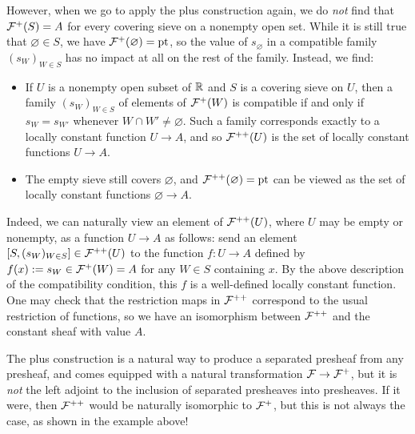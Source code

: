 \begin{example}
    However, when we go to apply the plus construction again, we do \emph{not} find that $\cal{F}^+(S) = A$ for every covering sieve on a nonempty open set. While it is still true that $\varnothing \in S$, we have $\cal{F}^+(\varnothing) = \pt$, so the value of $s_\varnothing$ in a compatible family $(s_W)_{W \in S}$ has no impact at all on the rest of the family. Instead, we find:
    \begin{itemize}
        \item If $U$ is a nonempty open subset of $\RR$ and $S$ is a covering sieve on $U$, then a family $(s_W)_{W \in S}$ of elements of $\cal{F}^+(W)$ is compatible if and only if $s_W = s_{W'}$ whenever $W \cap W' \neq \varnothing$. Such a family corresponds exactly to a locally constant function $U \to A$, and so $\cal{F}^{++}(U)$ is the set of locally constant functions $U \to A$.
        \item The empty sieve still covers $\varnothing$, and $\cal{F}^{++}(\varnothing) = \pt$ can be viewed as the set of locally constant functions $\varnothing \to A$.
    \end{itemize}
    Indeed, we can naturally view an element of $\cal{F}^{++}(U)$, where $U$ may be empty or nonempty, as a function $U \to A$ as follows: send an element $[S,(s_W)_{W \in S}] \in \cal{F}^{++}(U)$ to the function $f : U \to A$ defined by $f(x) := s_W \in \cal{F}^+(W) = A$ for any $W \in S$ containing $x$. By the above description of the compatibility condition, this $f$ is a well-defined locally constant function. One may check that the restriction maps in $\cal{F}^{++}$ correspond to the usual restriction of functions, so we have an isomorphism between $\cal{F}^{++}$ and the constant sheaf with value $A$.
\end{example}

\begin{warning}
    The plus construction is a natural way to produce a separated presheaf from any presheaf, and comes equipped with a natural transformation $\cal{F} \to \cal{F}^+$, but it is \emph{not} the left adjoint to the inclusion of separated presheaves into presheaves. If it were, then $\cal{F}^{++}$ would be naturally isomorphic to $\cal{F}^+$, but this is not always the case, as shown in the example above!
\end{warning}

\startlecture[Oct 15, 2026]

